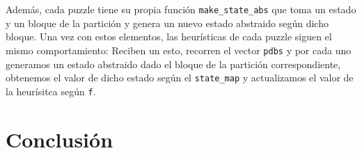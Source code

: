 \documentclass[a4paper,10pt]{article}
\begin{document}
    Adem\'as, cada puzzle tiene su propia funci\'on \verb|make_state_abs| que toma un 
    estado y un bloque de la partici\'on y genera un nuevo estado abstraido seg\'un 
    dicho bloque. Una vez con estos elementos, las heur\'isticas de cada puzzle siguen 
    el mismo comportamiento: Reciben un esto, recorren el vector \verb|pdbs| y por cada 
    uno generamos un estado abstraido dado el bloque de la partici\'on correspondiente, 
    obtenemos el valor de dicho estado seg\'un el \verb|state_map| y actualizamos el 
    valor de la heur\'isitca seg\'un \verb|f|. 
\section{Conclusi\'on}
\end{document}
